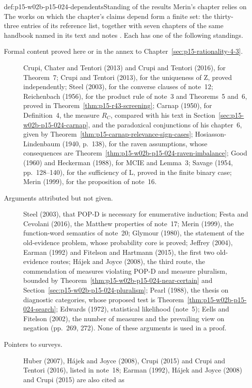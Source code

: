 \begin{proofboundary}{def:p15-w02b-p15-024-dependents}{Standing of the results Merin's chapter relies on}
The works on which the chapter's claims depend form a finite set: the
thirty-three entries of its reference list, together with seven chapters
of the same handbook named in its text and notes
\cite[pp.~267, 273 and pp.~274--275]{Merin2021Relevance}. Each has one
of the following standings.
\begin{description}
\item[Formal content proved here or in the annex to
  Chapter~\ref{sec:p15-rationality-4-3}.] Crupi, Chater and Tentori
  (2013) and Crupi and Tentori (2016), for Theorem~7; Crupi and Tentori
  (2013), for the uniqueness of Z, proved independently; Steel (2003),
  for the converse clauses of note~12; Reichenbach (1956), for the
  product rule of note~3 and Theorems~5 and~6, proved in
  Theorem~\ref{thm:p15-r43-screening}; Carnap (1950), for Definition~4,
  the measure \(R_C\), compared with his text in
  Section~\ref{sec:p15-w02b-p15-024-carnap}, and the paradoxical
  conjunctions of his chapter~6, given by
  Theorem~\ref{thm:p15-carnap-relevance-sign-cases}; Hosiasson-Lindenbaum
  (1940, p.~138), for the raven assumptions, whose consequences are
  Theorem~\ref{thm:p15-w02b-p15-024-raven-imbalance}; Good (1960) and
  Heckerman (1988), for MCIE and Lemma~3; Savage (1954, pp.~128--140),
  for the sufficiency of L, proved in the finite binary case; Merin
  (1999), for the proposition of note~16.
\item[Arguments attributed but not given.] Steel (2003), that POP-D is
  necessary for enumerative induction; Festa and Cevolani (2016), the
  Matthew properties of note~17; Merin (1999), the function-word
  semantics of note~20; Glymour (1980), the statement of the old-evidence
  problem, whose probability core is proved; Jeffrey (2004), Earman
  (1992) and Fitelson and Hartmann (2015), the first two old-evidence
  routes; H\'ajek and Joyce (2008), the third route, the commendation of
  measures violating POP-D and measure pluralism, bounded by
  Theorem~\ref{thm:p15-w02b-p15-024-near-certain} and
  Section~\ref{sec:p15-w02b-p15-024-pluralism}; Pearl (1988), the thesis
  on diagnostic categories, whose proposed test is
  Theorem~\ref{thm:p15-w02b-p15-024-search}; Edwards (1972), statistical
  likelihood (note~5); Eells and Fitelson (2002), the number of measures
  and the prevailing view on negation (pp.~269, 272). None of these
  arguments is used in a proof.
\item[Pointers to surveys.] Huber (2007), H\'ajek and Joyce (2008),
  Crupi (2015) and Crupi and Tentori (2016), listed in note~18; Earman
  (1992), H\'ajek and Joyce (2008) and Crupi (2015) are also cited as

\end{description}
\end{proofboundary}

